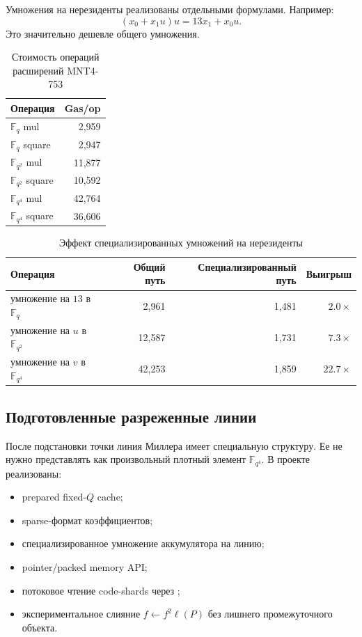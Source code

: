 \documentclass[12pt,a4paper]{article}
\newcommand{\Fq}{\mathbb{F}_q}
\newcommand{\code}[1]{\texttt{\detokenize{#1}}}
\begin{document}
Умножения на нерезиденты реализованы отдельными формулами. Например:
\[
    (x_0+x_1u)u=13x_1+x_0u.
\]
Это значительно дешевле общего умножения.

\begin{table}[htbp]
\centering
\caption{Стоимость операций расширений MNT4-753}
\small
\begin{tabular}{l r}
\toprule
Операция & Gas/op \\
\midrule
$\Fq$ mul & 2,959 \\
$\Fq$ square & 2,947 \\
$\mathbb{F}_{q^2}$ mul & 11,877 \\
$\mathbb{F}_{q^2}$ square & 10,592 \\
$\mathbb{F}_{q^4}$ mul & 42,764 \\
$\mathbb{F}_{q^4}$ square & 36,606 \\
\bottomrule
\end{tabular}
\end{table}

\begin{table}[htbp]
\centering
\caption{Эффект специализированных умножений на нерезиденты}
\small
\begin{tabular}{l r r r}
\toprule
Операция & Общий путь & Специализированный путь & Выигрыш \\
\midrule
умножение на $13$ в $\Fq$ & 2,961 & 1,481 & $2.0\times$ \\
умножение на $u$ в $\mathbb{F}_{q^2}$ & 12,587 & 1,731 & $7.3\times$ \\
умножение на $v$ в $\mathbb{F}_{q^4}$ & 42,253 & 1,859 & $22.7\times$ \\
\bottomrule
\end{tabular}
\end{table}

\subsection{Подготовленные разреженные линии}

После подстановки точки линия Миллера имеет специальную структуру. Ее не нужно
представлять как произвольный плотный элемент $\mathbb{F}_{q^4}$. В проекте
реализованы:
\begin{itemize}
    \item prepared fixed-$Q$ cache;
    \item sparse-формат коэффициентов;
    \item специализированное умножение аккумулятора на линию;
    \item pointer/packed memory API;
    \item потоковое чтение code-shards через \code{EXTCODECOPY};
    \item экспериментальное слияние $f\leftarrow f^2\ell(P)$ без лишнего
    промежуточного объекта.
\end{itemize}
\end{document}
